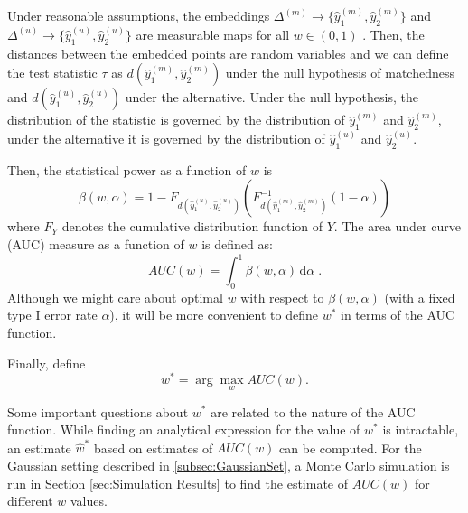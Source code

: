 \documentclass[12pt]{article} %
\begin{document}
 Under reasonable assumptions, the embeddings $\Delta^{(m)} \rightarrow  \{\hat{y}_{1}^{(m)},\hat{y}_{2}^{(m)}\!\}$  and $\Delta^{(u)}\rightarrow \{\hat{y}_{1}^{(u)} , \hat{y}_{2}^{(u)}\}$ are measurable maps for all $w \in (0,1)$ \cite{measurable_Niemiro1992}. Then, the distances between the embedded points are random variables and we can define the test statistic $\tau$ as $d(\hat{y}_{1}^{(m)},\hat{y}_{2}^{(m)})$ under the null hypothesis of matchedness and $d(\hat{y}_{1}^{(u)},\hat{y}_{2}^{(u)})$ under the alternative. Under the null hypothesis, the distribution of the statistic is governed by the distribution of $\hat{y}_{1}^{(m)}$ and $\hat{y}_{2}^{(m)}$, under the alternative it is governed by  the distribution of $\hat{y}_{1}^{(u)}$ and $\hat{y}_{2}^{(u)}$.

 Then, the statistical power as a function of $w$ is  \[\beta\left( w,\alpha\right)=1-F_{d \left(\hat{y}_{1}^{(u)},\hat{y}_{2}^{(u)}\right)} \left(F_{d\left(\hat{y}_{1}^{(m)},\hat{y}_{2}^{(m)}\right)}^{-1}(1-\alpha) \right)\] where $F_Y$ denotes  the   cumulative distribution function of  $Y$. The area under curve (AUC) measure  as a function of $w$ is defined as:  
\begin{equation} 
AUC(w)=\int_{0}^{1}\! \beta\left( w,\alpha\right)\,\mathrm{d}\alpha \; . \label{AUC_def}
\end{equation} 
Although we might care about optimal $w$ with respect to  $\beta\left( w,\alpha\right)$ (with a fixed type I error rate $\alpha$),  it will be more convenient to define $w^*$ in terms of the AUC function.

 Finally, define $$w^{*}=\arg\max_w{AUC\left( w\right)}. $$

 Some important questions about $w^*$ are  related to the nature of the AUC function.
While finding an analytical expression for the value of $w^*$ is intractable, an estimate $\hat{w}^*$  based on  estimates of $AUC(w)$ %
 can be computed.  For the Gaussian setting described in \ref{subsec:GaussianSet}, a Monte Carlo simulation is run in  Section  \ref{sec:Simulation Results} to find the estimate of $AUC(w)$ for different $w$ values.
\end{document}

